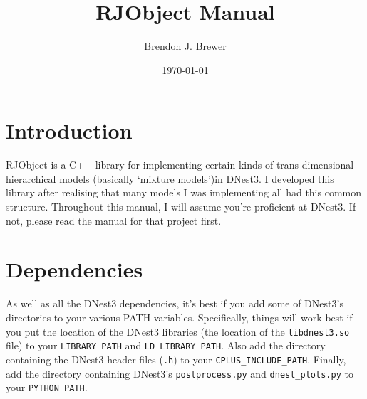 \documentclass[a4paper, 11pt]{article}
\title{RJObject Manual}
\author{Brendon J. Brewer}
\date{\today}
\begin{document}
\maketitle

\section{Introduction}
RJObject is a C++ library for implementing certain kinds of trans-dimensional
hierarchical models (basically `mixture models')in DNest3. I developed this
library after realising that many models I was implementing all had this
common structure.
Throughout this manual, I will assume you're proficient at
DNest3. If not, please read the manual for that project first.

\section{Dependencies}
As well as all the DNest3 dependencies, it's best if you add some of DNest3's
directories to your various PATH variables. Specifically, things will work best
if you put the location of the DNest3 libraries (the location of
the {\tt libdnest3.so} file) to your {\tt LIBRARY\_PATH} and
{\tt LD\_LIBRARY\_PATH}. Also add the directory containing the DNest3 header
files ({\tt *.h}) to your {\tt CPLUS\_INCLUDE\_PATH}. Finally, add the
directory containing DNest3's {\tt postprocess.py} and {\tt dnest\_plots.py} to
your {\tt PYTHON\_PATH}.
\end{document}
